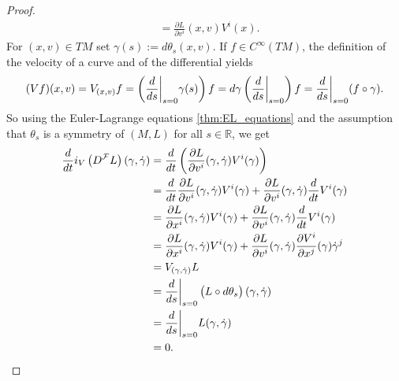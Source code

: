 \begin{proof}
\begin{align*}
		&= \frac{\partial L}{\partial v^i}(x,v) V^i(x).
	\end{align*}
	For $(x,v) \in TM$ set $\gamma(s) := d\theta_s(x,v)$. If $f \in C^\infty(TM)$, the definition of the velocity of a curve and of the differential yields
	\begin{equation*}
		(Vf)(x,v) = V_{(x,v)}f = \del[3]{\frac{d}{ds}\bigg\vert_{s = 0}\gamma(s)}f= d\gamma\del[3]{\frac{d}{ds}\bigg\vert_{s = 0}}f = \frac{d}{ds}\bigg\vert_{s = 0}(f \circ \gamma).
	\end{equation*}
	So using the Euler-Lagrange equations \ref{thm:EL_equations} and the assumption that $\theta_s$ is a symmetry of $(M,L)$ for all $s \in \mathbb{R}$, we get
	\begin{align*}
		\frac{d}{dt}i_V\del[1]{D^\mathcal{F}L}(\gamma,\dot{\gamma}) &= \frac{d}{dt}\del[3]{\frac{\partial L}{\partial v^i}(\gamma,\dot{\gamma}) V^i(\gamma)}\\
		&= \frac{d}{dt}\frac{\partial L}{\partial v^i}(\gamma,\dot{\gamma}) V^i(\gamma) + \frac{\partial L}{\partial v^i}(\gamma,\dot{\gamma}) \frac{d}{dt}V^i(\gamma)\\
		&= \frac{\partial L}{\partial x^i}(\gamma,\dot{\gamma}) V^i(\gamma) + \frac{\partial L}{\partial v^i}(\gamma,\dot{\gamma}) \frac{d}{dt}V^i(\gamma)\\
		&= \frac{\partial L}{\partial x^i}(\gamma,\dot{\gamma}) V^i(\gamma) + \frac{\partial L}{\partial v^i}(\gamma,\dot{\gamma}) \frac{\partial V^i}{\partial x^j}(\gamma)\dot{\gamma}^j\\
		&= V_{(\gamma,\dot{\gamma})}L\\
		&= \frac{d}{ds}\bigg\vert_{s = 0} \del[1]{L \circ d\theta_s}(\gamma,\dot{\gamma})\\
		&= \frac{d}{ds}\bigg\vert_{s = 0} L(\gamma,\dot{\gamma})\\
		&= 0.
	\end{align*}
\end{proof}
